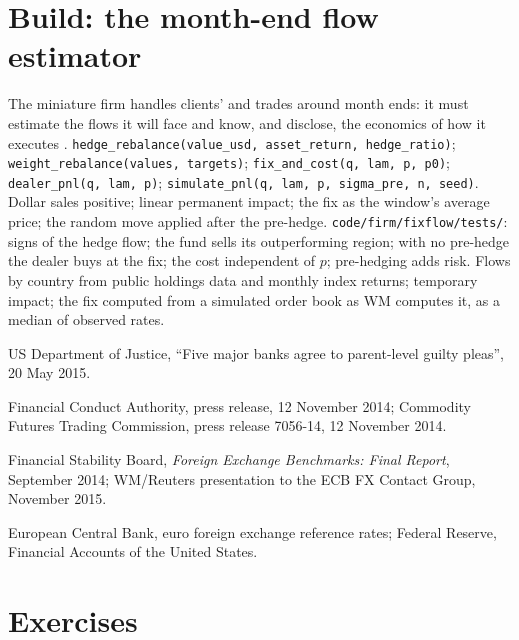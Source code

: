 \section{Build: the month-end flow estimator}\label{bld:m2:fixings-and-flows:fixflow}

\begin{build}
 The miniature firm handles clients'  and trades
around month ends: it must estimate the flows it will face and know, and
disclose, the economics of how it executes .
 \texttt{hedge\_rebalance(value\_usd, asset\_return,
hedge\_ratio)}; \texttt{weight\_rebalance(values, targets)};
\texttt{fix\_and\_cost(q, lam, p, p0)}; \texttt{dealer\_pnl(q, lam, p)};
\texttt{simulate\_pnl(q, lam, p, sigma\_pre, n, seed)}.
 Dollar sales positive; linear permanent impact; the fix as the
window's average price; the random move applied after the pre-hedge.
 \texttt{code/firm/fixflow/tests/}: signs of the hedge
flow; the fund sells its outperforming region; with no pre-hedge the dealer buys
at the fix; the cost independent of $p$; pre-hedging adds risk.
 Flows by country from public holdings data and monthly index
returns; temporary impact; the fix computed from a simulated order book as WM
computes it, as a median of observed rates.
\end{build}

\begin{omsources}
\item US Department of Justice, ``Five major banks agree to parent-level guilty
pleas'', 20 May 2015.
\item Financial Conduct Authority, press release, 12 November 2014; Commodity
Futures Trading Commission, press release 7056-14, 12 November 2014.
\item Financial Stability Board, \emph{Foreign Exchange Benchmarks: Final
Report}, September 2014; WM/Reuters presentation to the ECB FX Contact Group,
November 2015.
\item European Central Bank, euro foreign exchange reference rates; Federal
Reserve, Financial Accounts of the United States.
\end{omsources}

\section{Exercises}

